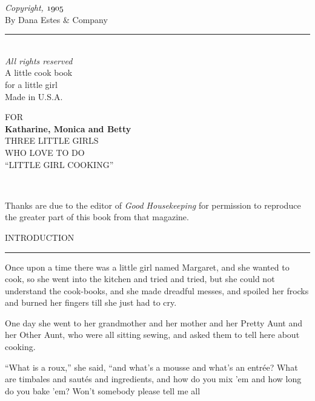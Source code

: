 \documentclass[11pt]{book}
\newcommand{\hstroke}{\rule[0.5ex]{5.0em}{0.2ex}}
\newcommand{\indpar}{\par\noindent\hspace*{\parindent}}
\begin{document}
\newpage
\thispagestyle{empty}
\vspace*{18ex}
\begin{center}
{\em Copyright, $\mit 1905$}\\
{\sc By Dana Estes \& Company}\\
\hstroke\\
{\em All rights reserved}\\
\vspace*{18ex}
{\sc A little cook book}\\
{\sc for a little girl}\\
\vspace*{12ex}
Made in U.S.A.
\end{center}
\newpage
\frontmatter
\thispagestyle{empty}
\vspace*{20ex}
\begin{center}
                           {\scriptsize FOR}\\
                {\large \bf Katharine, Monica and Betty}\\
\smallskip
                   {\footnotesize THREE LITTLE GIRLS\\
                     WHO LOVE TO DO\\
                   ``LITTLE GIRL COOKING''}
\end{center}
\newpage
\thispagestyle{empty}
\ 
\newpage
\thispagestyle{empty}
\vspace*{30ex}
\indpar Thanks are due to the editor of {\it Good Housekeeping\/} for
permission to reproduce the greater part of this book
from that magazine.
\newpage
\thispagestyle{empty}
\ 
\newpage
{}
\thispagestyle{plain}
\vspace*{3ex}
\begin{center}
{\Large INTRODUCTION}\\
\hstroke
\end{center}
\indpar
  Once upon a time there was a little girl named Margaret, and she
wanted to cook, so she went into the kitchen and tried and tried, but
she could not understand the cook-books, and she made dreadful messes,
and spoiled her frocks and burned her fingers till she just had to cry.
\indpar
  One day she went to her grandmother and her mother and her Pretty
Aunt and her Other Aunt, who were all sitting sewing, and asked them to
tell here about cooking.
\indpar
  ``What is a roux,'' she said, ``and what's a mousse and what's an
entr\'{e}e?  What are timbales and saut\'{e}s and ingredients, and how do you
mix 'em and how long do you bake 'em?  Won't somebody please tell me all
\end{document}
